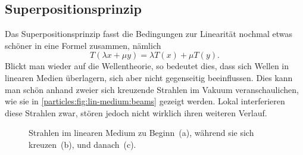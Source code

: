 \subsection{Superpositionsprinzip}\label{particles:section:lin-medium:superposition} %
Das Superpositionsprinzip fasst die Bedingungen zur Linearität nochmal etwas schöner in eine Formel zusammen, 
nämlich
\[
    T(\lambda x + \mu y)
    = 
    \lambda T(x) 
    + 
    \mu T(y).
\]
Blickt man wieder auf die Wellentheorie, so bedeutet dies, 
dass sich Wellen in linearen Medien überlagern, 
sich aber nicht gegenseitig beeinflussen.
Dies kann man schön anhand zweier sich kreuzende Strahlen im Vakuum veranschaulichen, 
wie sie in \autoref{particles:fig:lin-medium:beams} gezeigt werden.
Lokal interferieren diese Strahlen zwar, stören jedoch nicht wirklich ihren weiteren Verlauf.
\begin{figure}
    \centering
    \label{particles:fig:lin-medium:beams-1}\hfill
    \label{particles:fig:lin-medium:beams-2}\hfill
    \label{particles:fig:lin-medium:beams-3}
    \caption{Strahlen im linearen Medium zu Beginn~(a), während sie sich kreuzen~(b), und danach~(c).}\label{particles:fig:lin-medium:beams}
\end{figure}


